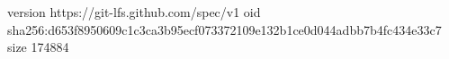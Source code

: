 version https://git-lfs.github.com/spec/v1
oid sha256:d653f8950609c1c3ca3b95ecf073372109e132b1ce0d044adbb7b4fc434e33c7
size 174884
